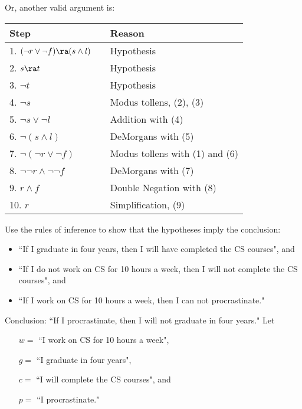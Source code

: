 \begin{questions}
\begin{solution}
    \newpage
    Or, another valid argument is:

    \begin{tabular}{lll}
        Step   & \hspace{0.2in}     & Reason \\
        \hline
        1. $(\neg r \vee \neg f) \ra (s \wedge l)$                &   & Hypothesis \\
        2. $s \ra t$                &   & Hypothesis \\
        3. $\neg t$  &   & Hypothesis \\
        4. $\neg s$                 &   & Modus tollens, (2), (3) \\
        5. $\neg s \vee \neg l$     &   & Addition with (4) \\
        6. $\neg(s \wedge l)$       &   & DeMorgans with (5) \\
        7. $\neg (\neg r \vee \neg f)$  & & Modus tollens with (1) and (6)\\
        8. $\neg \neg r \wedge \neg \neg f$ & & DeMorgans with (7) \\
        9. $r \wedge f$             &   & Double Negation with (8) \\
        10. $r$                     &   & Simplification, (9)
    \end{tabular}
\end{solution}



 Use the rules of inference to show that the hypotheses imply the conclusion:
\begin{itemize}[itemsep=0pt,parsep=0pt,topsep=0pt,partopsep=0pt]
    \item ``If I graduate in four years, then I will have completed the CS courses", and
    \item ``If I do not work on CS for 10 hours a week, then I will not complete the CS courses", and
    \item ``If I work on CS for 10 hours a week, then I can not procrastinate."
\end{itemize}
Conclusion: ``If I procrastinate, then I will not graduate in four years."
Let
\begin{itemize}[itemsep=0pt,parsep=0pt,topsep=0pt,partopsep=0pt]
    \item[$w = $] ``I work on CS for 10 hours a week",
    \item[$g = $] ``I graduate in four years",
    \item[$c = $] ``I will complete the CS courses", and
    \item[$p = $] ``I procrastinate."
\end{itemize}


\end{questions}
